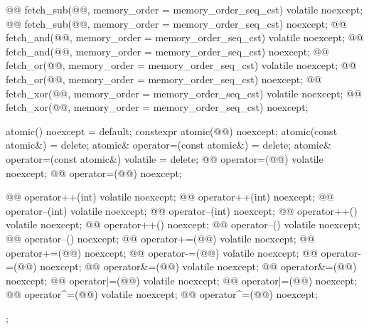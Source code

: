 \begin{codeblock}
{{    @@ fetch_sub(@@, memory_order = memory_order_seq_cst) volatile noexcept;
    @@ fetch_sub(@@, memory_order = memory_order_seq_cst) noexcept;
    @@ fetch_and(@@, memory_order = memory_order_seq_cst) volatile noexcept;
    @@ fetch_and(@@, memory_order = memory_order_seq_cst) noexcept;
    @@ fetch_or(@@, memory_order = memory_order_seq_cst) volatile noexcept;
    @@ fetch_or(@@, memory_order = memory_order_seq_cst) noexcept;
    @@ fetch_xor(@@, memory_order = memory_order_seq_cst) volatile noexcept;
    @@ fetch_xor(@@, memory_order = memory_order_seq_cst) noexcept;

    atomic() noexcept = default;
    constexpr atomic(@@) noexcept;
    atomic(const atomic&) = delete;
    atomic& operator=(const atomic&) = delete;
    atomic& operator=(const atomic&) volatile = delete;
    @@ operator=(@@) volatile noexcept;
    @@ operator=(@@) noexcept;

    @@ operator++(int) volatile noexcept;
    @@ operator++(int) noexcept;
    @@ operator--(int) volatile noexcept;
    @@ operator--(int) noexcept;
    @@ operator++() volatile noexcept;
    @@ operator++() noexcept;
    @@ operator--() volatile noexcept;
    @@ operator--() noexcept;
    @@ operator+=(@@) volatile noexcept;
    @@ operator+=(@@) noexcept;
    @@ operator-=(@@) volatile noexcept;
    @@ operator-=(@@) noexcept;
    @@ operator&=(@@) volatile noexcept;
    @@ operator&=(@@) noexcept;
    @@ operator|=(@@) volatile noexcept;
    @@ operator|=(@@) noexcept;
    @@ operator^=(@@) volatile noexcept;
    @@ operator^=(@@) noexcept;
  };

}
\end{codeblock}
